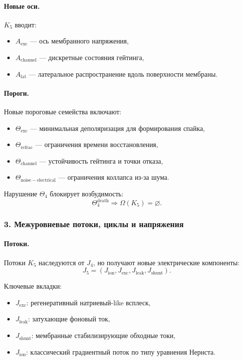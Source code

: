 \paragraph{Новые оси.}
$K_5$ вводит:
\begin{itemize}
  \item $A_{\mathrm{exc}}$ — ось мембранного напряжения,
  \item $A_{\mathrm{channel}}$ — дискретные состояния гейтинга,
  \item $A_{\mathrm{lat}}$ — латеральное распространение вдоль поверхности мембраны.
\end{itemize}

\paragraph{Пороги.}
Новые пороговые семейства включают:
\begin{itemize}
  \item $\Theta_{\mathrm{exc}}$ — минимальная деполяризация для формирования
        спайка,
  \item $\Theta_{\mathrm{refrac}}$ — ограничения времени восстановления,
  \item $\Theta_{\mathrm{channel}}$ — устойчивость гейтинга и точки отказа,
  \item $\Theta_{\mathrm{noise-electrical}}$ — ограничения коллапса из-за шума.
\end{itemize}

Нарушение $\Theta_4$ блокирует возбудимость:
\[
\Theta_4^{\mathrm{death}} \Rightarrow \Omega(K_5)=\varnothing.
\]

\subsubsection{3. Межуровневые потоки, циклы и напряжения}

\paragraph{Потоки.}
Потоки $K_5$ наследуются от $J_4$, но получают новые электрические
компоненты:
\[
J_5 = (J_{\mathrm{ion}}, J_{\mathrm{exc}}, J_{\mathrm{leak}}, J_{\mathrm{shunt}}).
\]

Ключевые вкладки:
\begin{itemize}
  \item \textbf{$J_{\mathrm{exc}}$}: регенеративный натриевый-like всплеск,
  \item \textbf{$J_{\mathrm{leak}}$}: затухающие фоновый ток,
  \item \textbf{$J_{\mathrm{shunt}}$}: мембранные стабилизирующие обходные токи,
  \item \textbf{$J_{\mathrm{ion}}$}: классический градиентный поток по типу
        уравнения Нернста.
\end{itemize}

